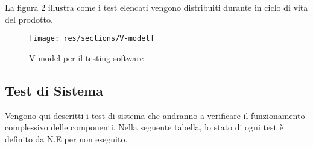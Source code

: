 	La figura 2 illustra come i test elencati vengono distribuiti durante in ciclo di vita del prodotto.

	\begin{figure}[H]
		\centering
		\texttt{[image: res/sections/V-model]}
		\caption{V-model per il testing software}
	\end{figure}
	

\subsection{Test di Sistema}
	Vengono qui descritti i test di sistema che andranno a verificare il funzionamento complessivo delle componenti. Nella seguente tabella, lo stato di ogni test è definito da N.E per non eseguito.

	
	
	
	
	
